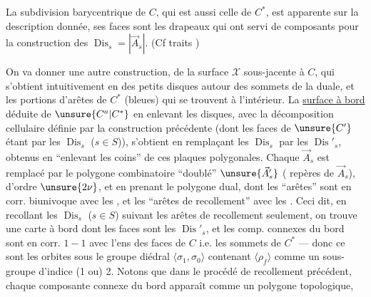 
La subdivision barycentrique de $C$, qui est aussi celle de $C^*$, est apparente sur la description donnée, ses faces sont les drapeaux qui ont servi de composants pour la construction des $\operatorname{Dis}_s=|\vec A_s|$. (Cf traits )

On va donner une autre construction, de la surface $\mathcal X$ sous-jacente à $C$, qui s'obtient intuitivement en  des petits disques  autour des sommets de la   duale,  et  les portions d'arêtes de $C^*$ (bleues) qui se trouvent à l'intérieur. La \uline{surface à bord} déduite de $\unsure{C^a|C^*}$ en enlevant les disques, avec la décomposition cellulaire définie par la construction précédente (dont les faces de $\unsure{C'}$ étant  par les $\operatorname{Dis}_s$ ($s\in S$)), s'obtient en remplaçant les $\operatorname{Dis}_s$ par les $\operatorname{Dis}'_s$, obtenus en ``enlevant les coins'' de ces plaques polygonales. Chaque $\vec A_s$ est remplacé par le polygone combinatoire ``doublé'' $\unsure{\vec A'_s}$ (  repères de $\vec A_s$),  d'ordre $\unsure{2\nu}$, et en prenant le polygone dual, dont les ``arêtes''  sont en corr. biunivoque avec les   , et les ``arêtes de recollement'' avec les   . Ceci dit, en recollant les $\operatorname{Dis}_s$ ($s\in S$) suivant les arêtes de recollement seulement, on trouve une carte à bord dont les faces sont les $\operatorname{Dis}'_s$, et les comp. connexes du bord sont en corr. $1-1$ avec l'ens des faces de $C$ i.e. les sommets de $C^*$ --- donc ce sont les orbites sous le groupe diédral $\langle\sigma_1,\sigma_0\rangle$ contenant $\langle\rho_f\rangle$ comme un sous-groupe d'indice (1 ou) 2. Notons que dans le procédé de recollement précédent, chaque composante connexe  du bord apparaît comme un polygone topologique, 

